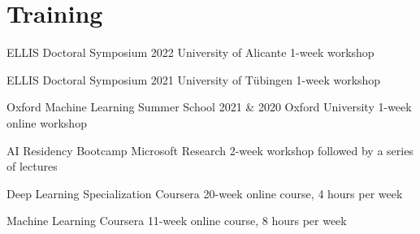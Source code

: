 \documentclass[]{friggeri-cv_osx}
\begin{document}
\section{Training}
\begin{entrylist}

\entry
{}
{ELLIS Doctoral Symposium 2022}
{University of Alicante}
{1-week workshop}

\entry
{}
{ELLIS Doctoral Symposium 2021}
{University of Tübingen}
{1-week workshop}

\entry
{}
{Oxford Machine Learning Summer School 2021 \& 2020}
{Oxford University}
{1-week online workshop}

\entry
{}
{AI Residency Bootcamp}
{Microsoft Research}
{2-week workshop followed by a series of lectures}

\entry
{}
{Deep Learning Specialization}
{Coursera}
{20-week online course, 4 hours per week}

\entry
{}
{Machine Learning}
{Coursera}
{11-week online course, 8 hours per week}

\end{entrylist}
\end{document}
